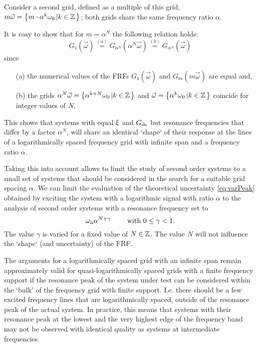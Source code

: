   Consider a second grid, defined as a multiple of this grid, $m\vec{\omega} = \left\{m \cdot \alpha^k \omega_0 \left| k \in \mathbb{Z} \right.\right\}$; both grids share the same frequency ratio $\alpha$.
  
  It is easy to show that for $m = \alpha^N$ the following relation holds:
  \begin{equation}
    G_1\left( \vec{\omega} \right)
    \stackrel{(a)}{=} G_{\alpha^N} \left( \alpha^N \vec{\omega} \right)
    \stackrel{(b)}{=} G_{\alpha^N} \left( \vec{\omega} \right)
    \label{eq:gridPeriodicity}
  \end{equation}
  since
  \begin{itemize}
   \item[(a)] the numerical values of the FRFs $G_1(\vec{\omega})$ and $G_m(m\vec{\omega})$ are equal and,
   \item[(b)] the grids $\alpha^N \vec{\omega} = \left\{\alpha^{k+N} \omega_0 \left| k \in \mathbb{Z} \right.\right\}$ and $\vec{\omega} = \left\{\alpha^k \omega_0 \left| k \in \mathbb{Z} \right.\right\}$ coincide for integer values of $N$.
  \end{itemize}

  This shows that systems with equal $\xi$ and $G_{\mathrm{dc}}$ but resonance frequencies that differ by a factor $\alpha^N$, will share an identical `shape` of their response at the lines of a logarithmically spaced frequency grid with infinite span and a frequency ratio $\alpha$.

  Taking this into account allows to limit the study of second order systems to a small set of systems that should be considered in the search for a suitable grid spacing $\alpha$.
  We can limit the evaluation of the theoretical uncertainty \eqref{eq:varPeak} obtained by exciting the system with a logarithmic signal with ratio $\alpha$ to the analysis of second order systems with a resonance frequency set to
  \begin{equation}
    \omega_{\mathrm{n}} \alpha^{N+\gamma}\qquad \text{ with } 0 \leq \gamma < 1\text{.}
    \label{eq:theoreticalBestVariationOmega}
  \end{equation}
  The value $\gamma$ is varied for a fixed value of $N \in \mathbb{Z}$.
  The value $N$ will not influence the `shape` (and uncertainty) of the FRF.

  The arguments for a logarithmically spaced grid with an infinite span remain approximately valid for quasi-logarithmically spaced grids with a finite frequency support if the resonance peak of the system under test can be considered within the `bulk' of the frequency grid with finite support.
  I.e. there should be a few excited frequency lines that are logarithmically spaced, outside of the resonance peak of the actual system.
  In practice, this means that systems with their resonance peak at the lowest and the very highest edge of the frequency band may not be observed with identical quality as systems at intermediate frequencies.

